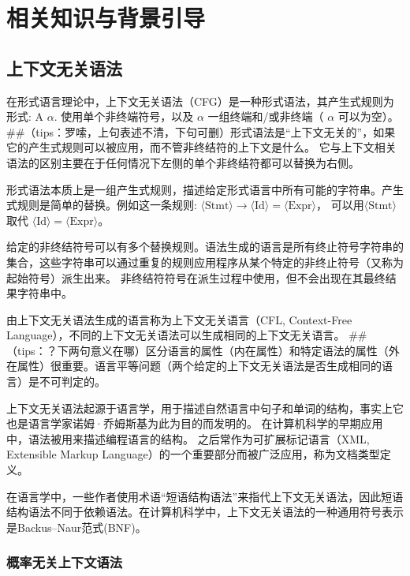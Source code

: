 
\chapter{相关知识与背景引导}


\section{上下文无关语法}

在形式语言理论中，上下文无关语法（CFG）是一种形式语法，其产生式规则为形式: A \rightarrow $\alpha$. 
使用单个非终端符号，以及 $\alpha$ 一组终端和/或非终端（ $\alpha$ 可以为空）。
##（tips：罗嗦，上句表述不清，下句可删）形式语法是“上下文无关的”，如果它的产生式规则可以被应用，而不管非终结符的上下文是什么。
它与上下文相关语法的区别主要在于任何情况下左侧的单个非终结符都可以替换为右侧。

形式语法本质上是一组产生式规则，描述给定形式语言中所有可能的字符串。产生式规则是简单的替换。例如这一条规则: $\displaystyle \langle {\text{Stmt}}\rangle \to \langle {\text{Id}}\rangle =\langle {\text{Expr}}\rangle$，
可以用$\displaystyle \langle {\text{Stmt}}\rangle$ 取代 $\langle {\text{Id}}\rangle =\langle {\text{Expr}}\rangle$。

给定的非终结符号可以有多个替换规则。语法生成的语言是所有终止符号字符串的集合，这些字符串可以通过重复的规则应用程序从某个特定的非终止符号（又称为起始符号）派生出来。
非终结符符号在派生过程中使用，但不会出现在其最终结果字符串中。

由上下文无关语法生成的语言称为上下文无关语言（CFL, Context-Free Language），不同的上下文无关语法可以生成相同的上下文无关语言。
##（tips：？下两句意义在哪）区分语言的属性（内在属性）和特定语法的属性（外在属性）很重要。语言平等问题（两个给定的上下文无关语法是否生成相同的语言）是不可判定的。

上下文无关语法起源于语言学，用于描述自然语言中句子和单词的结构，事实上它也是语言学家诺姆·乔姆斯基为此为目的而发明的。
在计算机科学的早期应用中，语法被用来描述编程语言的结构。
之后常作为可扩展标记语言（XML,  Extensible Markup Language）的一个重要部分而被广泛应用，称为文档类型定义\cite{hopcroft2001introduction}。

在语言学中，一些作者使用术语“短语结构语法”来指代上下文无关语法，因此短语结构语法不同于依赖语法。在计算机科学中，上下文无关语法的一种通用符号表示是Backus–Naur范式(BNF)。

\subsection{概率无关上下文语法}

